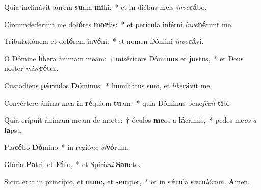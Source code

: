 \item Quia inclinávit aurem \textbf{su}am \textbf{mi}hi:~* et in diébus meis \textit{invo}\textbf{cá}bo.
\item Circumdedérunt me do\textbf{ló}res \textbf{mor}tis:~* et perícula inférni \textit{inve}\textbf{né}runt me.
\item Tribulatiónem et do\textbf{ló}rem in\textbf{vé}ni:~* et nomen Dómini \textit{in}\textit{vo}\textbf{cá}vi.
\item O Dómine líbera ánimam meam:~† miséricors Dómi\textbf{nus} et \textbf{ju}stus,~* et Deus noster \textit{mise}\textbf{ré}tur.
\item Custódiens \textbf{pár}vulos \textbf{Dó}minus:~* humiliátus sum, et \textit{libe}\textbf{rá}vit me.
\item Convértere ánima mea in \textbf{ré}quiem \textbf{tu}am:~* quia Dóminus bene\textit{fécit} \textbf{ti}bi.
\item Quia erípuit ánimam meam de morte:~† óculos \textbf{me}os a \textbf{lá}crimis,~* pedes me\tinyhspace\textit{os} \textit{a} \textbf{la}psu.
\item Pla\textbf{cé}bo \textbf{Dó}mino~* in regió\textit{ne} \textit{vi}\textbf{vó}rum.
\item Glória \textbf{Pa}tri, et \textbf{Fí}lio,~* et Spirí\tinyhspace\textit{tui} \textbf{San}cto.
\item Sicut erat in princípio, et \textbf{nunc,} et \textbf{sem}per,~* et in sǽcula sæcu\tinyhspace\textit{lórum.} \textbf{A}men.
